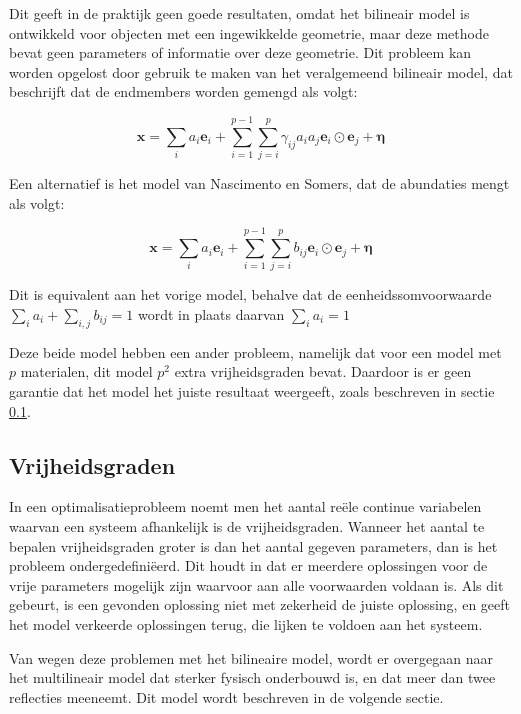 \documentclass[12pt]{report}
\begin{document}
Dit geeft in de praktijk geen goede resultaten, omdat het bilineair model is ontwikkeld voor objecten met een ingewikkelde geometrie, maar deze methode bevat geen parameters of informatie over deze geometrie. Dit probleem kan worden opgelost door gebruik te maken van het veralgemeend bilineair model\cite{mlinmix}, dat beschrijft dat de endmembers worden gemengd als volgt:

\begin{equation}
\bm{x} = \sum_i a_i \bm{e}_i + \sum_{i=1}^{p-1} \sum_{j=i}^{p}  \gamma_{ij} a_i a_j \bm{e}_i \odot \bm{e}_j + \bm{\eta}
\end{equation}

Een alternatief is het model van Nascimento en Somers, dat de abundaties mengt als volgt:

\begin{equation}
\bm{x} = \sum_i a_i \bm{e}_i + \sum_{i=1}^{p-1} \sum_{j=i}^{p}  b_{ij} \bm{e}_i \odot \bm{e}_j + \bm{\eta}
\end{equation}

Dit is equivalent aan het vorige model, behalve dat de eenheidssomvoorwaarde $\sum_i a_i + \sum_{i,j} b_{ij} = 1$ wordt in plaats daarvan $\sum_i a_i = 1$

Deze beide model hebben een ander probleem, namelijk dat voor een model met $p$ materialen, dit model $p^2$ extra vrijheidsgraden bevat. Daardoor is er geen garantie dat het model het juiste resultaat weergeeft, zoals beschreven in sectie \ref{sec:vrij}. 



\subsection{Vrijheidsgraden} \label{sec:vrij}

In een optimalisatieprobleem noemt men het aantal re\"ele continue variabelen waarvan een systeem afhankelijk is de vrijheidsgraden. Wanneer het aantal te bepalen vrijheidsgraden groter is dan het aantal gegeven parameters, dan is het probleem ondergedefini\"eerd. Dit houdt in dat er meerdere  oplossingen voor de vrije parameters mogelijk zijn waarvoor aan alle voorwaarden voldaan is. Als dit gebeurt, is een gevonden oplossing niet met zekerheid de juiste oplossing, en geeft het model verkeerde oplossingen terug, die lijken te voldoen aan het systeem.

Van wegen deze problemen met het bilineaire model, wordt er overgegaan naar het multilineair model dat sterker fysisch onderbouwd is, en dat meer dan twee reflecties meeneemt. Dit model wordt beschreven in de volgende sectie.
\end{document}
